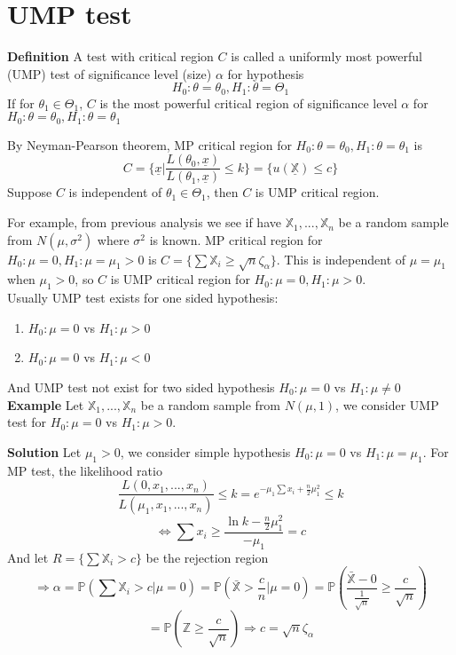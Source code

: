 \section{UMP test}
\textbf{Definition} A test with critical region $C$ is called a uniformly most powerful (UMP) test of significance level (size) $\alpha$ for hypothesis 
$$H_0: \theta = \theta_0, H_1: \theta = \Theta_1$$
If for $\theta_1 \in \Theta_1$, $C$ is the most powerful critical region of significance level $\alpha$ for $H_0: \theta = \theta_0, H_1: \theta = \theta_1$

By Neyman-Pearson theorem, MP critical region for $H_0: \theta = \theta_0, H_1: \theta = \theta_1$ is
$$C = \{ \underline{x} | \frac{L(\theta_0, \underline{x})}{L(\theta_1, \underline{x})} \leq k \} = \{u(\underline{\mathbb{X}}) \leq c \}$$
Suppose $C$ is independent of $\theta_1 \in \Theta_1$, then $C$ is UMP critical region.

For example, from previous analysis we see if have $\mathbb{X}_1, ..., \mathbb{X}_n$ be a random sample from $N(\mu, \sigma^2)$ where $\sigma^2$  is known. MP critical region for $H_0: \mu = 0, H_1: \mu = \mu_1 > 0$ is $C = \{ \sum \mathbb{X}_i \geq \sqrt{n}\zeta_\alpha\}$. This is independent of $\mu = \mu_1$ when $\mu_1 > 0$, so $C$ is UMP critical region for $H_0: \mu = 0, H_1: \mu > 0$.\\

Usually UMP test exists for one sided hypothesis:
\begin{enumerate}
\item $H_0: \mu = 0$ vs $H_1: \mu > 0$
\item $H_0: \mu = 0$ vs $H_1: \mu < 0$
\end{enumerate}

And UMP test not exist for two sided hypothesis
$H_0: \mu = 0$ vs $H_1: \mu \neq 0$\\

\textbf{Example} Let $\mathbb{X}_1, ..., \mathbb{X}_n$ be a random sample from $N(\mu, 1)$, we consider UMP test for $H_0: \mu = 0$ vs $H_1: \mu > 0$.

\textbf{Solution} Let $\mu_1 > 0$, we consider simple hypothesis $H_0: \mu = 0$ vs $H_1: \mu = \mu_1$. For MP test, the likelihood ratio
$$\frac{L(0, x_1, ..., x_n)}{L(\mu_1, x_1, ..., x_n)} \leq k = e^{-\mu_1 \sum x_i + \frac{n}{2} \mu_1^2} \leq k$$
$$\iff \sum x_i \geq \frac{\ln k - \frac{n}{2}\mu_1^2}{-\mu_1} = c$$
And let $R = \{ \sum \mathbb{X}_i > c \}$ be the rejection region
$$\Rightarrow \alpha = \mathbb{P}( \sum \mathbb{X}_i > c | \mu = 0 ) = 
\mathbb{P}( \bar{\mathbb{X}} > \frac{c}{n} | \mu = 0 ) = \mathbb{P}( \frac{\bar{\mathbb{X}} - 0}{\frac{1}{\sqrt{n}}} \geq \frac{c}{\sqrt{n}})$$
$$= \mathbb{P}(\mathbb{Z} \geq \frac{c}{\sqrt{n}}) \Rightarrow c = \sqrt{n}\zeta_{\alpha}$$

